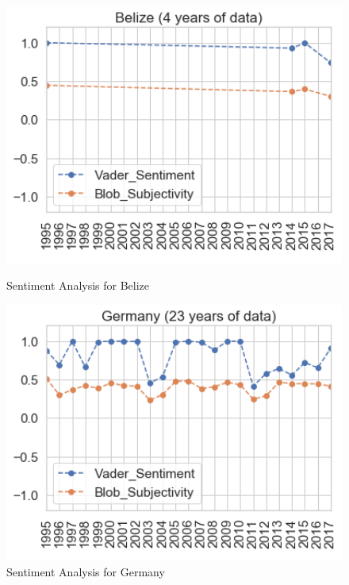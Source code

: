 \begin{figure}[t]
    \centering
    \vspace{10pt}
    \begin{minipage}{0.47\textwidth}
        \centering
        \includegraphics[width=1.1\textwidth]{img/Belize_average.png} %
        \caption{Sentiment Analysis for Belize}
        \label{belize}
    \end{minipage}\hfill
    \begin{minipage}{0.47\textwidth}
        \centering
        \includegraphics[width=1.1\textwidth]{img/Germany_average.png} %
        \caption{Sentiment Analysis for Germany}
        \label{germany}
    \end{minipage}
\end{figure}

